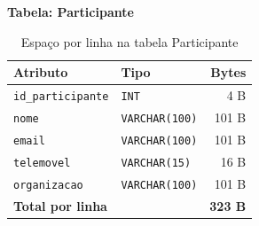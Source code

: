 \documentclass[runningheads]{llncs}
\begin{document}
                \vspace{0.4cm}
                \noindent\begin{minipage}{\textwidth}
                \noindent\textbf{Tabela: Participante}\\[0.2cm]
                \begin{table}[H]
                \centering
                \renewcommand{\arraystretch}{1.3}
                \begin{tabular}{|l|l|r|}
                \hline
                \textbf{Atributo} & \textbf{Tipo} & \textbf{Bytes} \\ \hline
                \texttt{id\_participante} & \texttt{INT}          & 4 B \\ \hline
                \texttt{nome}             & \texttt{VARCHAR(100)} & 101 B \\ \hline
                \texttt{email}            & \texttt{VARCHAR(100)} & 101 B \\ \hline
                \texttt{telemovel}        & \texttt{VARCHAR(15)}  & 16 B \\ \hline
                \texttt{organizacao}      & \texttt{VARCHAR(100)} & 101 B \\ \hline
                \textbf{Total por linha}  & & \textbf{323 B} \\ \hline
                \end{tabular}
                \vspace{0.2cm}
                \caption{Espaço por linha na tabela Participante} \label{tab:bytes_participante}
                \end{table}
                \end{minipage}
\end{document}
